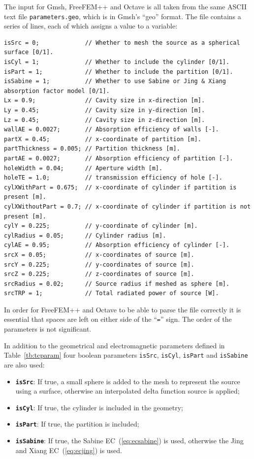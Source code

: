 \documentclass[a4paper]{article}
\numberwithin{equation}{section}
\newcounter{Table}
\begin{document}
The input for Gmsh, FreeFEM++ and Octave is all taken from the same ASCII text file \texttt{parameters.geo}, which
is in Gmsh's ``geo'' format. The file contains a series of lines, each of which assigns a value to a variable:
{\small
\begin{verbatim}
isSrc = 0;             // Whether to mesh the source as a spherical surface [0/1].
isCyl = 1;             // Whether to include the cylinder [0/1].
isPart = 1;            // Whether to include the partition [0/1].
isSabine = 1;          // Whether to use Sabine or Jing & Xiang absorption factor model [0/1].
Lx = 0.9;              // Cavity size in x-direction [m].
Ly = 0.45;             // Cavity size in y-direction [m].
Lz = 0.45;             // Cavity size in z-direction [m].
wallAE = 0.0027;       // Absorption efficiency of walls [-].
partX = 0.45;          // x-coordinate of partition [m].
partThickness = 0.005; // Partition thickness [m].
partAE = 0.0027;       // Absorption efficiency of partition [-].
holeWidth = 0.04;      // Aperture width [m].
holeTE = 1.0;          // transmission efficiency of hole [-].
cylXWithPart = 0.675;  // x-coordinate of cylinder if partition is present [m].
cylXWithoutPart = 0.7; // x-coordinate of cylinder if partition is not present [m].
cylY = 0.225;          // y-coordinate of cylinder [m].
cylRadius = 0.05;      // Cylinder radius [m].
cylAE = 0.95;          // Absorption efficiency of cylinder [-].
srcX = 0.05;           // x-coordinates of source [m].
srcY = 0.225;          // y-coordinates of source [m].
srcZ = 0.225;          // z-coordinates of source [m].
srcRadius = 0.02;      // Source radius if meshed as sphere [m].
srcTRP = 1;            // Total radiated power of source [W].
\end{verbatim}}
\noindent In order for FreeFEM++ and Octave to be able to parse the file correctly it is essential 
that spaces are left on either side of the ``\texttt{=}'' sign. The order of the parameters is 
not significant. 

In addition to the geometrical and electromagnetic parameters defined in 
Table~\ref{tb:tcparam} four boolean parameters \texttt{isSrc}, \texttt{isCyl}, \texttt{isPart} and 
\texttt{isSabine} are also used:
\begin{itemize}
 \item \textbf{\texttt{isSrc}}: If true, a small sphere is added to the mesh to represent the source using a surface,
 otherwise an interpolated delta function source is applied;
 \item \textbf{\texttt{isCyl}}: If true, the cylinder is included in the geometry;
 \item \textbf{\texttt{isPart}}: If true, the partition is included;
 \item \textbf{\texttt{isSabine}}: If true, the Sabine EC~(\ref{eq:ecsabine}) is used,
 otherwise the Jing and Xiang EC~(\ref{eq:ecjing}) is used.
\end{itemize}
\end{document}
